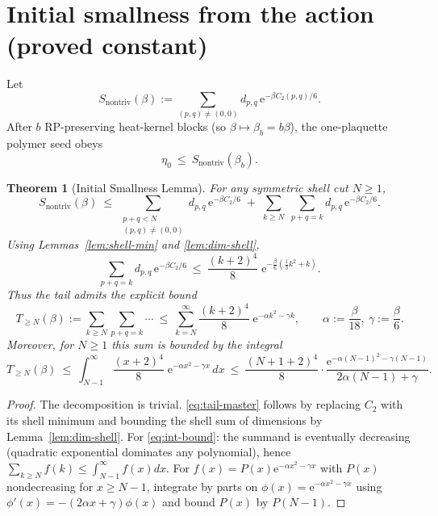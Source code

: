 \documentclass[11pt]{article}
\newtheorem{theorem}{Theorem}[section]
\theoremstyle{definition}
\theoremstyle{remark}
\newcommand{\e}{\mathrm{e}}
\begin{document}
\section{Initial smallness from the action (proved constant)}
Let
\[
  S_{\mathrm{nontriv}}(\beta):=\sum_{(p,q)\neq(0,0)} d_{p,q}\,\e^{-\beta C_2(p,q)/6}.
\]
After $b$ RP-preserving heat-kernel blocks (so $\beta\mapsto \beta_b=b\beta$), the one-plaquette polymer seed obeys
\begin{equation}\label{eq:eta0-lemma}
  \eta_0 \ \le\ S_{\mathrm{nontriv}}(\beta_b).
\end{equation}

\begin{theorem}[Initial Smallness Lemma]\label{thm:smallness}
For any symmetric shell cut $N\ge1$,
\[
  S_{\mathrm{nontriv}}(\beta) \ \le\ \sum_{\substack{p+q<N\\(p,q)\neq(0,0)}} d_{p,q}\,\e^{-\beta C_2/6}\;+\; \sum_{k\ge N}\;\sum_{p+q=k} d_{p,q}\,\e^{-\beta C_2/6}.
\]
Using Lemmas~\ref{lem:shell-min} and \ref{lem:dim-shell},
\begin{equation}\label{eq:tail-master}
  \sum_{p+q=k} d_{p,q}\,\e^{-\beta C_2/6} \ \le\ \frac{(k+2)^4}{8}\;\e^{-\frac{\beta}{6}(\frac13 k^2+k)}.
\end{equation}
Thus the tail admits the explicit bound
\begin{equation}\label{eq:tail-bound}
  T_{\ge N}(\beta):=\sum_{k\ge N}\sum_{p+q=k}\cdots \ \le\ \sum_{k=N}^\infty \frac{(k+2)^4}{8}\;\e^{-\alpha k^2-\gamma k},
\qquad \alpha:=\frac{\beta}{18},\ \gamma:=\frac{\beta}{6}.
\end{equation}
Moreover, for $N\ge1$ this sum is bounded by the integral
\begin{equation}\label{eq:int-bound}
  T_{\ge N}(\beta)\ \le\ \int_{N-1}^\infty \frac{(x+2)^4}{8}\;\e^{-\alpha x^2-\gamma x}\,dx
  \ \le\ \frac{(N+1+2)^4}{8}\cdot \frac{\e^{-\alpha (N-1)^2-\gamma (N-1)}}{2\alpha (N-1)+\gamma}.
\end{equation}
\end{theorem}
\begin{proof}
The decomposition is trivial. \eqref{eq:tail-master} follows by replacing $C_2$ with its shell minimum and bounding the shell sum of dimensions by Lemma~\ref{lem:dim-shell}.
For \eqref{eq:int-bound}: the summand is eventually decreasing (quadratic exponential dominates any polynomial), hence $\sum_{k\ge N}f(k)\le\int_{N-1}^\infty f(x)dx$. For $f(x)=P(x)\e^{-\alpha x^2-\gamma x}$ with $P(x)$ nondecreasing for $x\ge N-1$, integrate by parts on $\phi(x)=\e^{-\alpha x^2-\gamma x}$ using $\phi'(x)=-(2\alpha x+\gamma)\phi(x)$ and bound $P(x)$ by $P(N-1)$.
\end{proof}
\end{document}
